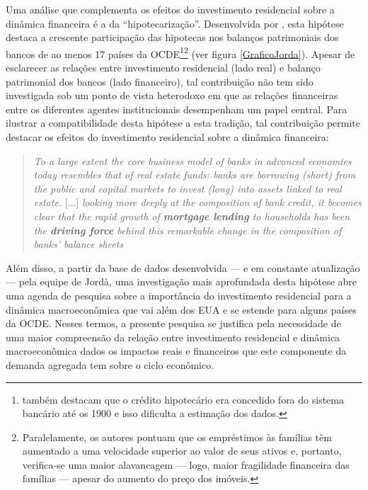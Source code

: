 Uma análise que complementa os efeitos do investimento residencial sobre a dinâmica financeira é a da ``hipotecarização''. 
Desenvolvida por \textcite{jorda_great_2014}, esta hipótese destaca a crescente participação das hipotecas nos balanços patrimoniais dos bancos de ao menos 17 países da OCDE\footnote{\textcite{jorda_great_2014} também destacam que o crédito hipotecário era concedido fora do sistema bancário até os 1900 e isso dificulta a estimação dos dados.}\footnote{Paralelamente, os autores pontuam que os empréstimos às famílias têm aumentado a uma velocidade superior ao valor de seus ativos e, portanto, verifica-se uma maior alavancagem --- logo, maior fragilidade financeira das famílias --- apesar do aumento do preço dos imóveis.} (ver figura \ref{GraficoJorda}).
Apesar de esclarecer as relações entre investimento residencial (lado real) e balanço patrimonial dos bancos (lado financeiro), tal contribuição não tem sido investigada sob um ponto de vista heterodoxo em que as relações financeiras entre os diferentes agentes institucionais desempenham um papel central. Para ilustrar a compatibilidade desta hipótese a esta tradição, tal contribuição permite destacar os efeitos do investimento residencial sobre a dinâmica financeira: 

\begin{quote}
	\textit{To a large extent the core business model of banks in advanced economies today resembles that of real estate funds: banks are borrowing (short) from the public and capital markets to invest (long) into assets linked to real estate.} [...] \textit{looking more deeply at the composition of bank credit, it becomes clear that the rapid growth of \textbf{mortgage lending} to households has been the \textbf{driving force} behind this remarkable change in the composition of banks’ balance sheets} \cite[p.~2, grifos adicionados]{jorda_great_2014}
\end{quote}
Além disso, a partir da base de dados desenvolvida --- e em constante atualização --- pela equipe de Jordà, uma investigação mais aprofundada desta hipótese abre uma agenda de pesquisa sobre a importância do investimento residencial para a dinâmica macroeconômica que vai além dos EUA e se estende para alguns países da OCDE. Nesses termos, a presente pesquisa se justifica pela necessidade de uma maior compreensão 
da relação entre investimento residencial e dinâmica macroeconômica dados os impactos reais e financeiros que este componente da demanda agregada tem sobre o ciclo econômico. 

